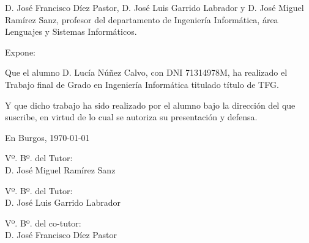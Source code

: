 \documentclass[a4paper,12pt,twoside]{memoir}
\newcommand{\nombre}{Lucía Núñez Calvo} %
\begin{document}
\noindent D. José Francisco Díez Pastor, D. José Luis Garrido Labrador y D. José Miguel Ramírez Sanz, profesor del departamento de Ingeniería Informática, área Lenguajes y Sistemas Informáticos.

\noindent Expone:

\noindent Que el alumno D. \nombre, con DNI 71314978M, ha realizado el Trabajo final de Grado en Ingeniería Informática titulado título de TFG. 

\noindent Y que dicho trabajo ha sido realizado por el alumno bajo la dirección del que suscribe, en virtud de lo cual se autoriza su presentación y defensa.

\begin{center} %
En Burgos, {\large \today}
\end{center}

\vfill\vfill\vfill

\begin{minipage}{0.2\textwidth}
\begin{flushleft} %
Vº. Bº. del Tutor:\\[3cm]
D. José Miguel Ramírez Sanz
\end{flushleft}
\end{minipage}
\hfill
\begin{minipage}{0.2\textwidth}
\begin{flushleft} %
Vº. Bº. del Tutor:\\[3cm]
D. José Luis Garrido Labrador
\end{flushleft}
\end{minipage}
\hfill
\begin{minipage}{0.2\textwidth}
\begin{flushleft} %
Vº. Bº. del co-tutor:\\[3cm]
D. José Francisco Díez Pastor
\end{flushleft}
\end{minipage}
\hfill

\vfill



\newpage\null\thispagestyle{empty}\newpage




\frontmatter
\end{document}
